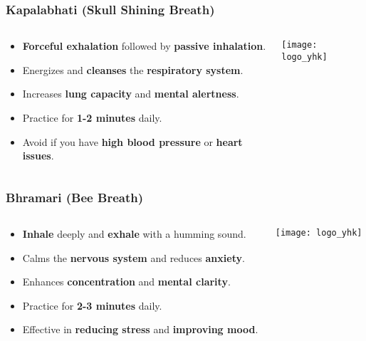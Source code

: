 \begin{frame}[fragile]\frametitle{Kapalabhati (Skull Shining Breath)}
\begin{columns}
    \begin{column}[T]{0.5\linewidth}
      \begin{itemize}
        \item \textbf{Forceful exhalation} followed by \textbf{passive inhalation}.
        \item Energizes and \textbf{cleanses} the \textbf{respiratory system}.
        \item Increases \textbf{lung capacity} and \textbf{mental alertness}.
        \item Practice for \textbf{1-2 minutes} daily.
        \item Avoid if you have \textbf{high blood pressure} or \textbf{heart issues}.
      \end{itemize}
    \end{column}
    \begin{column}[T]{0.5\linewidth}
        \begin{center}
        \texttt{[image: logo\_yhk]}
        \end{center}	
    \end{column}
\end{columns}
\end{frame}

\begin{frame}[fragile]\frametitle{Bhramari (Bee Breath)}
\begin{columns}
    \begin{column}[T]{0.5\linewidth}
      \begin{itemize}
        \item \textbf{Inhale} deeply and \textbf{exhale} with a humming sound.
        \item Calms the \textbf{nervous system} and reduces \textbf{anxiety}.
        \item Enhances \textbf{concentration} and \textbf{mental clarity}.
        \item Practice for \textbf{2-3 minutes} daily.
        \item Effective in \textbf{reducing stress} and \textbf{improving mood}.
      \end{itemize}
    \end{column}
    \begin{column}[T]{0.5\linewidth}
        \begin{center}
        \texttt{[image: logo\_yhk]}
        \end{center}	
    \end{column}
\end{columns}
\end{frame}

